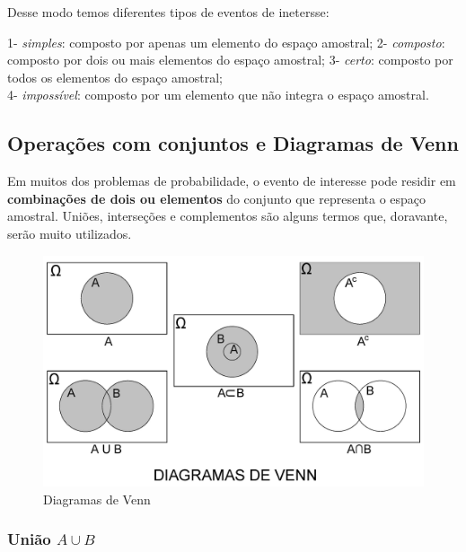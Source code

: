 \documentclass[
]{book}
\begin{document}
\hfill\break

Desse modo temos diferentes tipos de eventos de inetersse:

\hfill\break

1- \emph{simples}: composto por apenas um elemento do espaço amostral;
2- \emph{composto}: composto por dois ou mais elementos do espaço amostral;
3- \emph{certo}: composto por todos os elementos do espaço amostral;\\
4- \emph{impossível}: composto por um elemento que não integra o espaço amostral.

\hfill\break

\hypertarget{operauxe7uxf5es-com-conjuntos-e-diagramas-de-venn}{%
\subsection{Operações com conjuntos e Diagramas de Venn}\label{operauxe7uxf5es-com-conjuntos-e-diagramas-de-venn}}

Em muitos dos problemas de probabilidade, o evento de interesse pode residir em \textbf{combinações de dois ou elementos} do conjunto que representa o espaço amostral. Uniões, interseções e complementos são alguns termos que, doravante, serão muito utilizados.

\hfill\break

\begin{figure}

{\centering \includegraphics[width=0.8\linewidth]{images4/venn} 

}

\caption{Diagramas de Venn}\label{fig:unnamed-chunk-51}
\end{figure}

\hfill\break

\hypertarget{uniuxe3o-a-cup-b}{%
\subsubsection{\texorpdfstring{União \(A \cup B\)}{União A \textbackslash cup B}}\label{uniuxe3o-a-cup-b}}
\end{document}
